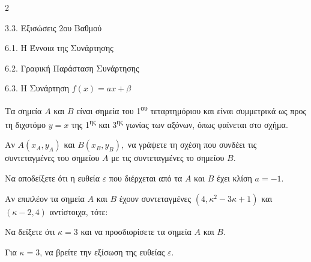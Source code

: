 \begin{ylh}{2}
    \item 3.3. Εξισώσεις 2ου Βαθμού
    \item 6.1. Η Έννοια της Συνάρτησης
    \item 6.2. Γραφική Παράσταση Συνάρτησης
    \item 6.3. Η Συνάρτηση $f(x)=ax+\beta$
\end{ylh}

Τα σημεία $A$ και $B$ είναι σημεία του 1\textsuperscript{ου} τεταρτημόριου και είναι συμμετρικά ως προς τη διχοτόμο $y = x$ της 1\textsuperscript{ης} και 3\textsuperscript{ης} γωνίας των αξόνων, όπως φαίνεται στο σχήμα.
\begin{center}
\end{center}
\begin{alist}
\item Αν $A(x_{A},y_{A})$ και $B\left( x_{B},y_{B} \right),$ να γράψετε τη σχέση που συνδέει τις συντεταγμένες του σημείου $A$ με τις συντεταγμένες το σημείου $B$.

\item Να αποδείξετε ότι η ευθεία $\varepsilon$ που διέρχεται από τα $A$ και $B$ έχει κλίση $a = - 1$.
\item Αν επιπλέον τα σημεία $A$ και $B$ έχουν συντεταγμένες $(4,\kappa^{2} - 3\kappa + 1)$ και $(\kappa - 2,4)$ αντίστοιχα, τότε:
\begin{rlist}
\item
  Να δείξετε ότι $\kappa = 3$ και να προσδιορίσετε τα σημεία $A$ και $B$.
\item
  Για $\kappa = 3$, να βρείτε την εξίσωση της ευθείας $\varepsilon$.
\end{rlist}
\end{alist}

